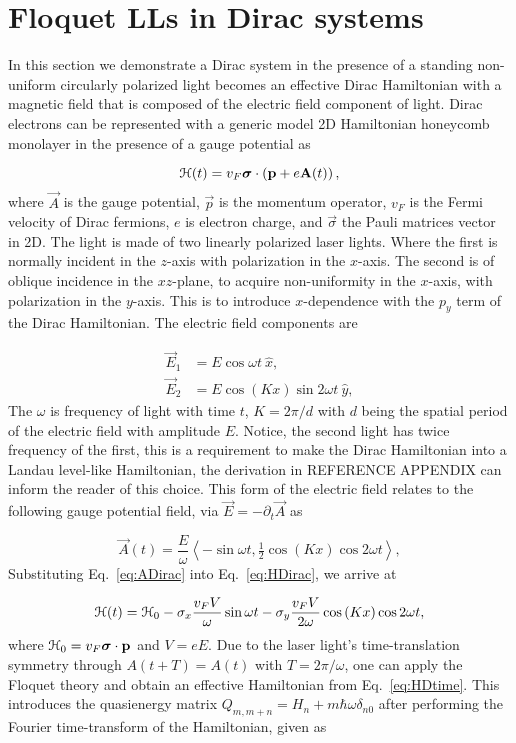 \section{Floquet LLs in Dirac systems}
In this section we demonstrate a Dirac system in the presence of a standing non-uniform circularly polarized light becomes an effective Dirac Hamiltonian with a magnetic field that is composed of the electric field component of light.
Dirac electrons can be represented with a generic model 2D Hamiltonian honeycomb monolayer in the presence of a gauge potential as

\begin{equation}\label{eq:HDirac}
  \mathcal{H}(t) = v_{F} \bm{\sigma} \cdot \left(\mathbf{p} + e\mathbf{A}(t)\right),
\end{equation}
where $\vec{A}$ is the gauge potential, $\vec{p}$ is the momentum operator, $v_F$ is the Fermi velocity of Dirac fermions, $e$ is electron charge, and $\vec{\sigma}$ the Pauli matrices vector in 2D.
The light is made of two linearly polarized laser lights.
Where the first is normally incident in the $z$-axis with polarization in the $x$-axis.
The second is of oblique incidence in the $xz$-plane, to acquire non-uniformity in the $x$-axis, with polarization in the $y$-axis.
This is to introduce $x$-dependence with the $p_y$ term of the Dirac Hamiltonian.
The electric field components are

\begin{align} \label{eq:EDfield}
\vec{E}_{1} &= E\cos \omega t\ \hat{x}, \nonumber \\
\vec{E}_{2} &= E\cos(Kx)\sin 2\omega t\ \hat{y},
\end{align}
The $\omega $ is frequency of light with time $t$, $K=2\pi /d$ with $d$ being the spatial period of the electric field with amplitude $E$.
Notice, the second light has twice frequency of the first, this is a requirement to make the Dirac Hamiltonian into a Landau level-like Hamiltonian, the derivation in REFERENCE APPENDIX can inform the reader of this choice.
This form of the electric field relates to the following gauge potential field, via $\vec{E} = -\partial_t \vec{A}$ as

\begin{equation}\label{eq:ADirac}
  \vec{A}(t)= \dfrac{E}{\omega} \left\langle -\sin \omega t, \tfrac{1}{2}\cos(Kx) \cos 2\omega t \right\rangle,
\end{equation}%
Substituting Eq.~\eqref{eq:ADirac} into Eq.~\eqref{eq:HDirac}, we arrive at%

\begin{equation}\label{eq:HDtime}
  \mathcal{H}(t)=\mathcal{H}_{0} - \sigma _{x} \dfrac{v_F V}{\omega} \sin {\omega t} - \sigma _{y} \dfrac{v_F V}{2\omega}\cos{(Kx)} \cos2\omega t,
\end{equation}%
where $\mathcal{H}_0 = v_{F}\bm{\sigma}\cdot\mathbf{p}$ and $V = eE$.
Due to the laser light's time-translation symmetry through $A(t+T)=A(t)$ with $T=2\pi /\omega $, one can apply the Floquet theory \cite{AEE, MBL, supp} and obtain an effective Hamiltonian from Eq.~\eqref{eq:HDtime}.
This introduces the quasienergy matrix $Q_{m,m+n} = H_n + m\hbar\omega\delta_{n0}$ after performing the Fourier time-transform of the Hamiltonian, given as

